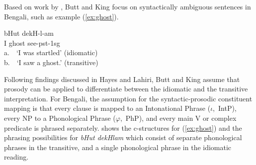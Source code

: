 \documentclass[output=paper,hidelinks]{langscibook}
\begin{document}
Based on work by \citet{HayesLahiri1991}, Butt and King focus on syntactically ambiguous sentences in Bengali, such as example (\ref{ex:ghost}).

\ea \label{ex:ghost}
 {bHut}  {dekH-l-am} \\
{I} {ghost} {see-{\sc pst}-{\sc 1sg}} \\
\glt a.\ \ `I was startled' \hspace{2ex}(idiomatic)\\
b.\ \ `I saw a ghost.' \hspace{1.5ex}(transitive)
\z

\noindent Following findings discussed in Hayes and Lahiri, Butt and King assume that prosody can be applied to differentiate between the idiomatic and the transitive interpretation.
For Bengali, the assumption for the syntactic-prosodic constituent mapping is that every clause is mapped to an Intonational Phrase ($\iota$,~IntP), every NP to a Phonological Phrase ($\varphi$,~PhP), and every main V or complex predicate is  phrased separately.  shows the c-structures for (\ref{ex:ghost}) and the phrasing possibilities for {\em bHut dekHlam} which consist of separate phonological phrases in the transitive, and a single phonological phrase in the idiomatic reading.
\end{document}

